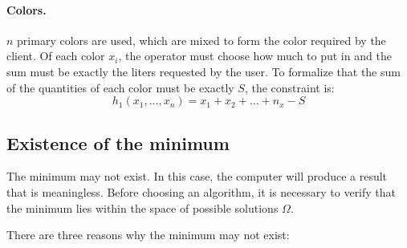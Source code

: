 \paragraph{Colors.} \( n \) primary colors are used, which are mixed to form the color required by the client. Of each color \( x_i \), the operator must choose how much to put in and the sum must be exactly the liters requested by the user. To formalize that the sum of the quantities of each color must be exactly \( S \), the constraint is:
\[ h_1(x_1, ..., x_n) = x_1 + x_2 + ... + n_x - S \]

\subsection{Existence of the minimum}

The minimum may not exist. In this case, the computer will produce a result that is meaningless. Before choosing an algorithm, it is necessary to verify that the minimum lies within the space of possible solutions \( \Omega \).

There are three reasons why the minimum may not exist:

